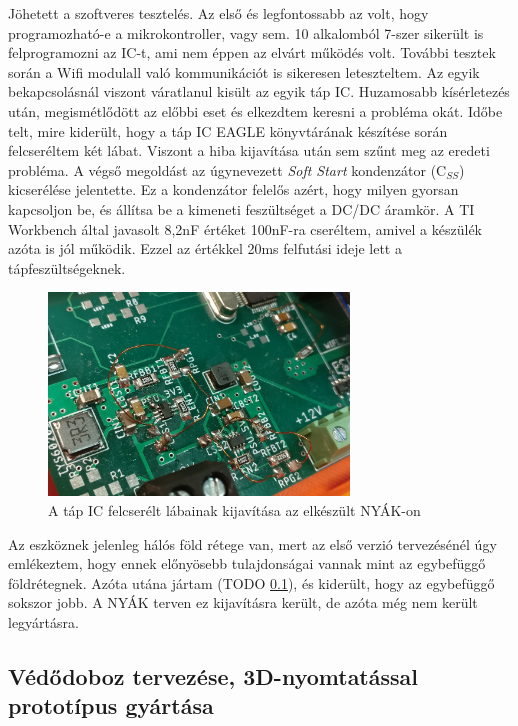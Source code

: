 \documentclass[../main.tex]{subfiles}
\begin{document}
        Jöhetett a szoftveres tesztelés. Az első és legfontossabb az volt, hogy programozható-e a mikrokontroller, vagy sem. 10 alkalomból 7-szer sikerült is felprogramozni az IC-t, ami nem éppen az elvárt működés volt. További tesztek során a Wifi modulall való kommunikációt is sikeresen leteszteltem. Az egyik bekapcsolásnál viszont váratlanul kisült az egyik táp IC. Huzamosabb kísérletezés után, megismétlődött az előbbi eset és elkezdtem keresni a probléma okát. Időbe telt, mire kiderült, hogy a táp IC EAGLE könyvtárának készítése során felcseréltem két lábat. Viszont a hiba kijavítása után sem szűnt meg az eredeti probléma. A végső megoldást az úgynevezett \textit{Soft Start} kondenzátor (C$_{SS}$) kicserélése jelentette. Ez a kondenzátor felelős azért, hogy milyen gyorsan kapcsoljon be, és állítsa be a kimeneti feszültséget a DC/DC áramkör. A TI Workbench által javasolt 8,2nF értéket 100nF-ra cseréltem, amivel a készülék azóta is jól működik. Ezzel az értékkel 20ms felfutási ideje lett a tápfeszültségeknek.
        
        \begin{figure}[h!]
            \centering
                \includegraphics[width=8cm]{resources/pcb_res/pcb_psu_lib_fail}
            \caption{A táp IC felcserélt lábainak kijavítása az elkészült NYÁK-on}
            \label{fig:pcb_psu_fail}
        \end{figure}
        
        Az eszköznek jelenleg hálós föld rétege van, mert az első verzió tervezésénél úgy emlékeztem, hogy ennek előnyösebb tulajdonságai vannak mint az egybefüggő földrétegnek. Azóta utána jártam (TODO \ref{}), és kiderült, hogy az egybefüggő sokszor jobb. A NYÁK terven ez kijavításra került, de azóta még nem került legyártásra.
        
    \subsection{Védődoboz tervezése, 3D-nyomtatással prototípus gyártása}
    
\end{document}
